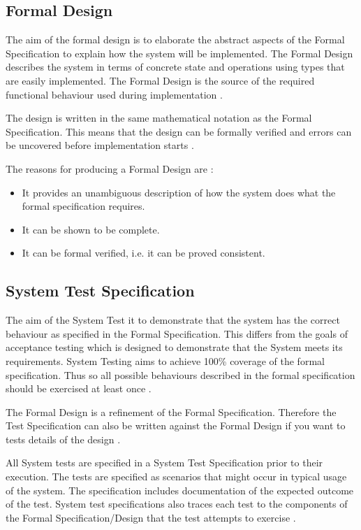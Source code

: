 \subsection{Formal Design}

The aim of the formal design is to elaborate the abstract aspects of the Formal 
Specification to explain how the system will be implemented. The Formal Design 
describes the system in terms of concrete state and operations using types that
are easily implemented. The Formal Design is the source of the required functional
behaviour used during implementation  \parencite{Tokeneer}.

The design is written in the same mathematical notation as the Formal Specification.
This means that the design can be formally verified and errors can be uncovered
before implementation starts \parencite{Tokeneer}.

The reasons for producing a Formal Design are  \parencite{Tokeneer}:
\begin{itemize}
	\item It provides an unambiguous description of how the system does what the formal specification requires.
	\item It can be shown to be complete.
	\item It can be formal verified, i.e. it can be proved consistent.
\end{itemize}

\subsection{System Test Specification}

The aim of the System Test it to demonstrate that the system has the correct 
behaviour as specified in the Formal Specification. This differs from the goals of
acceptance testing which is designed to demonstrate that the System meets
its requirements. System Testing aims to achieve 100\% coverage of the formal 
specification. Thus so all possible behaviours described in the formal specification
should be exercised at least once \parencite{Tokeneer}.

The Formal Design is a refinement of the Formal Specification. Therefore the Test
Specification can also be written against the Formal Design if you want to tests 
details of the design \parencite{Tokeneer}.

All System tests are specified in a System Test Specification prior to their 
execution.  The tests are specified as scenarios that might occur in typical usage
of the system. The specification includes documentation of the expected outcome
of the test. System test specifications also traces each test to the components
of the Formal Specification/Design that the test attempts to exercise \parencite{Tokeneer}.

